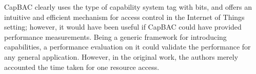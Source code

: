 CapBAC clearly uses the type of capability system tag with bits, and offers an intuitive and efficient mechanism for access control in the Internet of Things setting; however, it would have been useful if CapBAC could have provided performance measurements. Being a generic framework for introducing capabilities, a performance evaluation on it could validate the performance for any general application.  However, in the original work, the authors merely accounted the time taken for one resource access.

